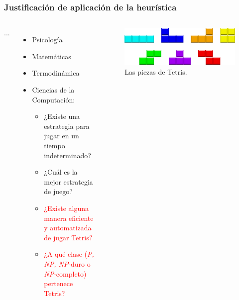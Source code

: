\begin{frame}
\frametitle{Justificación de aplicación de la heurística}

\begin{columns}
... 

\begin{itemize}

\item Psicología
\item Matemáticas
\item Termodinámica
\item Ciencias de la Computación:
\begin{itemize}

\item ¿Existe una estrategia para jugar en un tiempo indeterminado? 
\item ¿Cuál es la mejor estrategia de juego?
\item \textcolor<1>{red}{¿Existe alguna manera eficiente y automatizada de jugar Tetris?}
{}
\item \textcolor{red}{¿A qué clase (\textsl{P, NP, NP}-duro o \textsl{NP}-completo) pertenece Tetris?} 
{\onslide}
\end{itemize}

\end{itemize}

\begin{figure}
\includegraphics[scale=0.4]{./images/tetrominos.pdf}
\caption{Las piezas de Tetris.}
\end{figure}
\end{columns}

\end{frame}


